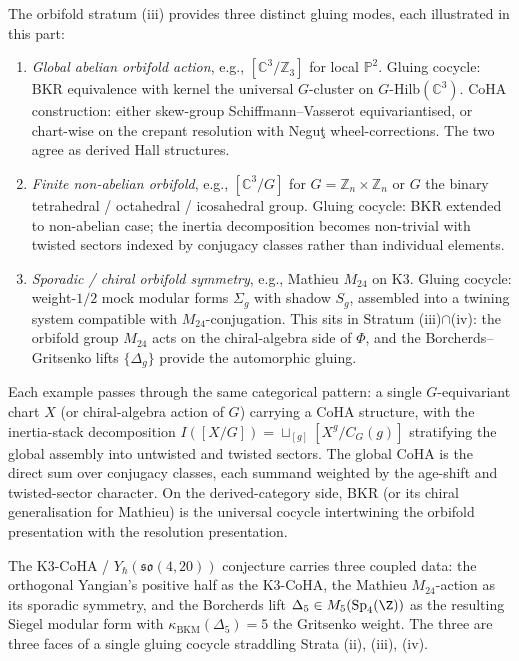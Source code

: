 The orbifold stratum (iii) provides three distinct gluing modes, each illustrated in this part:
\begin{enumerate}
 \item \emph{Global abelian orbifold action}, e.g., $[\mathbb{C}^3/\mathbb{Z}_3]$ for local $\mathbb{P}^2$. Gluing cocycle: BKR equivalence with kernel the universal $G$-cluster on $G\text{-}\mathrm{Hilb}(\mathbb{C}^3)$. CoHA construction: either skew-group Schiffmann--Vasserot equivariantised, or chart-wise on the crepant resolution with Negu\c{t} wheel-corrections. The two agree as derived Hall structures.
 \item \emph{Finite non-abelian orbifold}, e.g., $[\mathbb{C}^3/G]$ for $G = \mathbb{Z}_n \times \mathbb{Z}_n$ or $G$ the binary tetrahedral / octahedral / icosahedral group. Gluing cocycle: BKR extended to non-abelian case; the inertia decomposition becomes non-trivial with twisted sectors indexed by conjugacy classes rather than individual elements.
 \item \emph{Sporadic / chiral orbifold symmetry}, e.g., Mathieu $M_{24}$ on K3. Gluing cocycle: weight-$1/2$ mock modular forms $\Sigma_g$ with shadow $S_g$, assembled into a twining system compatible with $M_{24}$-conjugation. This sits in Stratum (iii)$\cap$(iv): the orbifold group $M_{24}$ acts on the chiral-algebra side of $\Phi$, and the Borcherds--Gritsenko lifts $\{\Delta_g\}$ provide the automorphic gluing.
\end{enumerate}

Each example passes through the same categorical pattern: a single $G$-equivariant chart $X$ (or chiral-algebra action of $G$) carrying a CoHA structure, with the inertia-stack decomposition $I([X/G]) = \sqcup_{[g]} [X^g / C_G(g)]$ stratifying the global assembly into untwisted and twisted sectors. The global CoHA is the direct sum over conjugacy classes, each summand weighted by the age-shift and twisted-sector character. On the derived-category side, BKR (or its chiral generalisation for Mathieu) is the universal cocycle intertwining the orbifold presentation with the resolution presentation.

The K$3$-CoHA / $Y_\hbar(\mathfrak{so}(4, 20))$ conjecture carries three coupled data: the orthogonal Yangian's positive half as the K$3$-CoHA, the Mathieu $M_{24}$-action as its sporadic symmetry, and the Borcherds lift $\Delta_5 \in M_5(\mathrm{Sp}_4(\Z))$ as the resulting Siegel modular form with $\kappa_{\mathrm{BKM}}(\Delta_5) = 5$ the Gritsenko weight. The three are three faces of a single gluing cocycle straddling Strata (ii), (iii), (iv).

